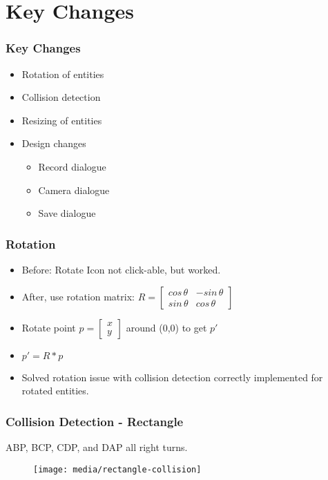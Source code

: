 

\section{Key Changes}
\begin{frame}
	\frametitle{Key Changes}
	\begin{itemize}
		\item Rotation of entities
		\item Collision detection
		\item Resizing of entities
		\item Design changes
		\begin{itemize}
			\item Record dialogue
			\item Camera dialogue
			\item Save dialogue
		\end{itemize}
	\end{itemize}
\end{frame}

\begin{frame}
	\frametitle{Rotation}
	\begin{itemize}
	\item Before: Rotate Icon not click-able, but worked.
	\item After, use rotation matrix: $R = \begin{bmatrix}
			cos\, \theta & - sin\, \theta\\
			sin\, \theta & cos\, \theta
			\end{bmatrix}$
	\item Rotate point $p = \begin{bmatrix}x\\y\end{bmatrix}$ around (0,0) to get $p'$
	\item $p' = R*p$
	\item Solved rotation issue with collision detection correctly implemented for rotated entities.
	\end{itemize}
\end{frame}



\begin{frame}
	\frametitle{Collision Detection - Rectangle}
	ABP, BCP, CDP, and DAP all right turns.
		\begin{figure}
		\centering
			\texttt{[image: media/rectangle-collision]}
		\end{figure}
\end{frame}

